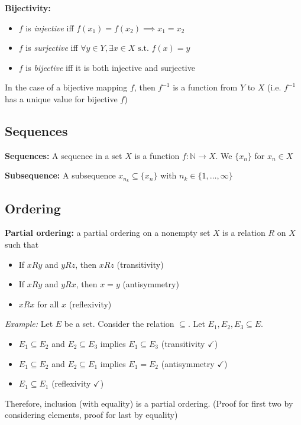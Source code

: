 \documentclass[12pt]{report}
\newcommand{\N}{\mathbb{N}}
\newcommand{\sub}{\subseteq}
\newcommand{\st}{\text{ s.t. }}
\begin{document}
    \textbf{Bijectivity:}
    \begin{itemize}
        \item $f$ is \emph{injective} iff $f(x_1) = f(x_2) \implies x_1 = x_2$
        \item $f$ is \emph{surjective} iff $\forall y \in Y, \exists x \in X \st f(x) = y$
        \item $f$ is \emph{bijective} iff it is both injective and surjective
    \end{itemize}

    In the case of a bijective mapping $f$, then $f^{-1}$ is a function from $Y$ to $X$ (i.e. $f^{-1}$ has a unique value for bijective $f$)

    \subsection*{Sequences}
    \textbf{Sequences:} A sequence in a set $X$ is a function $f: \N \to X$. We $\{x_n\}$ for $x_n \in X$
    
    \textbf{Subsequence:} A subsequence $x_{n_k} \subseteq \{x_n\}$ with $n_k \in \{1, \dots, \infty\}$

    \subsection*{Ordering}
    \textbf{Partial ordering:} a partial ordering on a nonempty set $X$ is a relation $R$ on $X$ such that 
    \begin{itemize}
        \item If $xRy$ and $yRz$, then $xRz$ (transitivity)
        \item If $xRy$ and $yRx$, then $x = y$ (antisymmetry)
        \item $xRx$ for all $x$ (reflexivity)
    \end{itemize}

    \emph{Example:} Let $E$ be a set. Consider the relation $\sub$. Let $E_1, E_2, E_3 \sub E$.
    \begin{itemize}
        \item $E_1 \sub E_2$ and $E_2 \sub E_3$ implies $E_1 \sub E_3$ (transitivity $\checkmark$)
        \item $E_1 \sub E_2$ and $E_2 \sub E_1$ implies $E_1 = E_2$ (antisymmetry $\checkmark$)
        \item $E_1 \sub E_1$ (reflexivity $\checkmark$)
    \end{itemize}
    Therefore, inclusion (with equality) is a partial ordering.
    (Proof for first two by considering elements, proof for last by equality)
\end{document}
